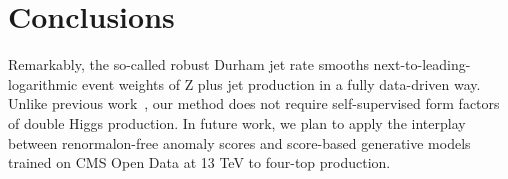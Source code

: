 \section{Conclusions}\label{sec:conclusions}

Remarkably, the so-called robust Durham jet rate smooths
next-to-leading-logarithmic event weights of Z plus jet production in a
fully data-driven way. Unlike previous
work~\cite{TPC:2195-YOLO-Yukawa-Enhanced-One-Loop-Leading-Color-Operators-September-19-2026},
our method does not require self-supervised form factors of double Higgs
production. In future work, we plan to apply the interplay between
renormalon-free anomaly scores and score-based generative models trained
on CMS Open Data at 13 TeV to four-top production.

